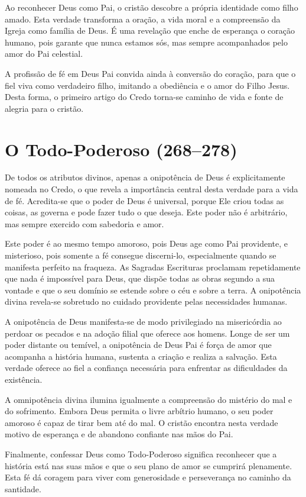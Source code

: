 Ao reconhecer Deus como Pai, o cristão descobre a própria identidade como filho amado. Esta verdade transforma a oração, a vida moral e a compreensão da Igreja como família de Deus. É uma revelação que enche de esperança o coração humano, pois garante que nunca estamos sós, mas sempre acompanhados pelo amor do Pai celestial.

A profissão de fé em Deus Pai convida ainda à conversão do coração, para que o fiel viva como verdadeiro filho, imitando a obediência e o amor do Filho Jesus. Desta forma, o primeiro artigo do Credo torna-se caminho de vida e fonte de alegria para o cristão.

\section{O Todo-Poderoso (268--278)}

De todos os atributos divinos, apenas a onipotência de Deus é explicitamente nomeada no Credo, o que revela a importância central desta verdade para a vida de fé. Acredita-se que o poder de Deus é universal, porque Ele criou todas as coisas, as governa e pode fazer tudo o que deseja. Este poder não é arbitrário, mas sempre exercido com sabedoria e amor.

Este poder é ao mesmo tempo amoroso, pois Deus age como Pai providente, e misterioso, pois somente a fé consegue discerni-lo, especialmente quando se manifesta perfeito na fraqueza. As Sagradas Escrituras proclamam repetidamente que nada é impossível para Deus, que dispõe todas as obras segundo a sua vontade e que o seu domínio se estende sobre o céu e sobre a terra. A onipotência divina revela-se sobretudo no cuidado providente pelas necessidades humanas.

A onipotência de Deus manifesta-se de modo privilegiado na misericórdia ao perdoar os pecados e na adoção filial que oferece aos homens. Longe de ser um poder distante ou temível, a onipotência de Deus Pai é força de amor que acompanha a história humana, sustenta a criação e realiza a salvação. Esta verdade oferece ao fiel a confiança necessária para enfrentar as dificuldades da existência.

A omnipotência divina ilumina igualmente a compreensão do mistério do mal e do sofrimento. Embora Deus permita o livre arbítrio humano, o seu poder amoroso é capaz de tirar bem até do mal. O cristão encontra nesta verdade motivo de esperança e de abandono confiante nas mãos do Pai.

Finalmente, confessar Deus como Todo-Poderoso significa reconhecer que a história está nas suas mãos e que o seu plano de amor se cumprirá plenamente. Esta fé dá coragem para viver com generosidade e perseverança no caminho da santidade.

